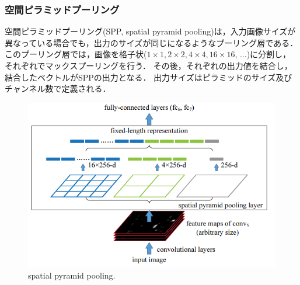     \subsubsection{空間ピラミッドプーリング}
    空間ピラミッドプーリング\cite{he2015spatial}(SPP, spatial pyramid pooling)は，入力画像サイズが異なっている場合でも，出力のサイズが同じになるようなプーリング層である．
    このプーリング層では，画像を格子状($1\times1, 2\times2, 4\times4, 16\times16$, ...)に分割し，それぞれでマックスプーリングを行う．
    その後，それぞれの出力値を結合し，結合したベクトルがSPPの出力となる．
    出力サイズはピラミッドのサイズ及びチャンネル数で定義される．
    \begin{figure}[ht]
        \begin{center}
            \includegraphics[width=12.0cm]{./8_appendix/img/SPP}
            \caption{spatial pyramid pooling\cite{he2015spatial}.}
        \end{center}
    \end{figure}
    

    
